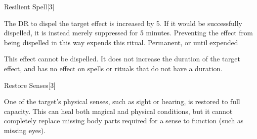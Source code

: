 \begin{spellsection}{Resilient Spell}[3]
    \begin{spellheader}
    \end{spellheader}
    \begin{spellcontent}
        \begin{spelltargetinginfo}
        \end{spelltargetinginfo}
        \begin{spelleffects}
            \spelleffect The DR to dispel the target effect is increased by 5.
            If it would be successfully dispelled, it is instead merely suppressed for 5 minutes.
            Preventing the effect from being dispelled in this way expends this ritual.
            \spelldur Permanent, or until expended
        \end{spelleffects}
    \end{spellcontent}
    \begin{spellfooter}
        \spellnotes This effect cannot be dispelled.
        It does not increase the duration of the target effect, and has no effect on spells or rituals that do not have a duration.
        \miscastexplode
    \end{spellfooter}
\end{spellsection}

\begin{spellsection}{Restore Senses}[3]
    \begin{spellheader}
    \end{spellheader}
    \begin{spellcontent}
        \begin{spelltargetinginfo}
        \end{spelltargetinginfo}
        \begin{spelleffects}
            \spelleffect One of the target's physical senses, such as sight or hearing, is restored to full capacity. This can heal both magical and physical conditions, but it cannot completely replace missing body parts required for a sense to function (such as missing eyes).
        \end{spelleffects}
    \end{spellcontent}
    \begin{spellfooter}
    \end{spellfooter}
    \begin{spellaugments}
    \end{spellaugments}
\end{spellsection}

